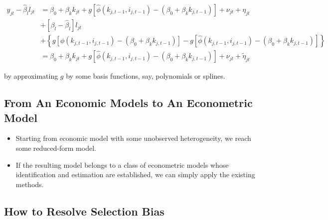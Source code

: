 \documentclass[]{book}
\providecommand{\tightlist}{%
  \setlength{\itemsep}{0pt}\setlength{\parskip}{0pt}}
\begin{document}
\begin{itemize}
  \begin{equation}
  \begin{split}
  y_{jt} - \hat{\beta}_l l_{jt}& = \beta_0 + \beta_k k_{jt} + g[\hat{\phi}(k_{j, t - 1}, i_{j, t - 1}) - (\beta_0 + \beta_k k_{j, t - 1})] + \nu_{jt} + \eta_{jt}\\
  &+ [\beta_l - \hat{\beta}_l] l_{jt}\\
  &+ \left\{g[\phi(k_{j, t - 1}, i_{j, t - 1}) - (\beta_0 + \beta_k k_{j, t - 1})] - g[\hat{\phi}(k_{j, t - 1}, i_{j, t - 1}) - (\beta_0 + \beta_k k_{j, t - 1})]\right\}\\
  & = \beta_0 + \beta_k k_{jt} + g[\hat{\phi}(k_{j, t - 1}, i_{j, t - 1}) - (\beta_0 + \beta_k k_{j, t - 1})] + \nu_{jt} + \tilde{\eta}_{jt}
  \end{split}
  \end{equation}

  by approximating \(g\) by some basis functions, say, polynomials or
  splines.
\end{itemize}

\subsection{From An Economic Models to An Econometric
Model}\label{from-an-economic-models-to-an-econometric-model}

\begin{itemize}
\tightlist
\item
  Starting from economic model with some unobserved heterogeneity, we
  reach some reduced-form model.
\item
  If the resulting model belongs to a class of econometric models whose
  identification and estimation are established, we can simply apply the
  existing methods.
\end{itemize}

\subsection{How to Resolve Selection
Bias}\label{how-to-resolve-selection-bias}
\end{document}
